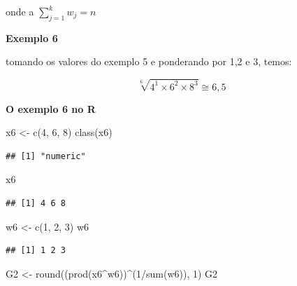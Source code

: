 \documentclass[
]{book}
\newenvironment{Shaded}{\begin{snugshade}}{\end{snugshade}}
\newcommand{\DecValTok}[1]{\textcolor[rgb]{0.00,0.00,0.81}{#1}}
\newcommand{\FunctionTok}[1]{\textcolor[rgb]{0.00,0.00,0.00}{#1}}
\newcommand{\NormalTok}[1]{#1}
\newcommand{\OtherTok}[1]{\textcolor[rgb]{0.56,0.35,0.01}{#1}}
\newcommand{\SpecialCharTok}[1]{\textcolor[rgb]{0.00,0.00,0.00}{#1}}
\begin{document}
onde a \(\sum_{j=1}^{k} w_j = n\)

\textbf{Exemplo 6}

tomando os valores do exemplo 5 e ponderando por 1,2 e 3, temos:

\begin{equation*}
  \sqrt[6]{4^1 \times 6^2 \times 8^3} \cong 6,5
\end{equation*}

\textbf{O exemplo 6 no R}

\begin{Shaded}
\begin{Highlighting}[]
\NormalTok{x6 }\OtherTok{\textless{}{-}} \FunctionTok{c}\NormalTok{(}\DecValTok{4}\NormalTok{, }\DecValTok{6}\NormalTok{, }\DecValTok{8}\NormalTok{)}
\FunctionTok{class}\NormalTok{(x6)}
\end{Highlighting}
\end{Shaded}

\begin{verbatim}
## [1] "numeric"
\end{verbatim}

\begin{Shaded}
\begin{Highlighting}[]
\NormalTok{x6}
\end{Highlighting}
\end{Shaded}

\begin{verbatim}
## [1] 4 6 8
\end{verbatim}

\begin{Shaded}
\begin{Highlighting}[]
\NormalTok{w6 }\OtherTok{\textless{}{-}} \FunctionTok{c}\NormalTok{(}\DecValTok{1}\NormalTok{, }\DecValTok{2}\NormalTok{, }\DecValTok{3}\NormalTok{)}
\NormalTok{w6}
\end{Highlighting}
\end{Shaded}

\begin{verbatim}
## [1] 1 2 3
\end{verbatim}

\begin{Shaded}
\begin{Highlighting}[]
\NormalTok{G2 }\OtherTok{\textless{}{-}} \FunctionTok{round}\NormalTok{((}\FunctionTok{prod}\NormalTok{(x6}\SpecialCharTok{\^{}}\NormalTok{w6))}\SpecialCharTok{\^{}}\NormalTok{(}\DecValTok{1}\SpecialCharTok{/}\FunctionTok{sum}\NormalTok{(w6)), }\DecValTok{1}\NormalTok{)}
\NormalTok{G2}
\end{Highlighting}
\end{Shaded}
\end{document}

